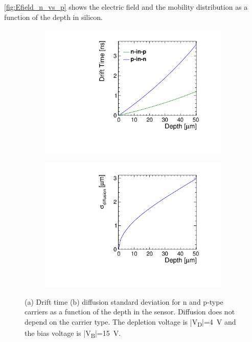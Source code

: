 \cref{fig:Efield_n_vs_p} shows the electric field and the mobility
distribution as a function of the depth in silicon.

\begin{figure}[htbp]
  \centering
  \begin{subfigure}[b]{0.45\textwidth}
    \includegraphics[width=\textwidth]{figures/ChargeSharing/DriftTime_n_vs_p_carrier.pdf}
    \caption{}
  \end{subfigure}\hfill
  \begin{subfigure}[b]{0.45\textwidth}
    \includegraphics[width=\textwidth]{figures/ChargeSharing/Diffusion_n_vs_p_carrier.pdf}
    \caption{}
  \end{subfigure}
  \caption{(a) Drift time (b) diffusion standard deviation for n and
    p-type carriers as a function of the depth in the
    sensor. Diffusion does not depend on the carrier type. The
    depletion voltage is |V\textsubscript{D}|=4~V and the bias voltage
    is |V\textsubscript{B}|=15~V.}\label{fig:Drift_n_vs_p}
\end{figure}

